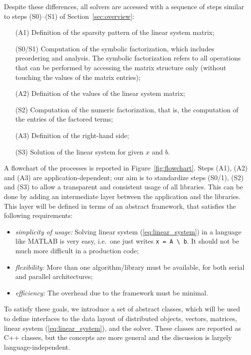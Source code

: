 \documentclass[acmtocl]{acmtrans2m}
\begin{document}
Despite these differences, all solvers are accessed with a sequence of
steps similar to steps (S0)--(S1) of Section~\ref{sec:overview}:
\begin{enumerate}
\item[(A1)] Definition of the sparsity pattern of the linear system matrix;
\item[(S0/S1)] Computation of the symbolic factorization, which includes
preordering and analysis. The
symbolic factorization refers to all operations that can be performed by
accessing the matrix structure only (without touching the values of the matrix entries);
\item[(A2)] Definition of the values of the linear system matrix;
\item[(S2)] Computation of the numeric factorization, that is, the computation
of the entries of the factored terms;
\item[(A3)] Definition of the right-hand side;
\item[(S3)] Solution of the linear system for given $x$ and $b$.
\end{enumerate}
A flowchart of the processes is reported in Figure~\ref{fig:flowchart}.
Steps (A1), (A2) and (A3) are application-dependent; 
our aim is to standardize steps (S0/1), (S2)
and (S3) to allow a transparent and consistent usage of all libraries. This
can be done by adding an intermediate layer between the application and the
libraries. This layer will be defined in terms of an abstract framework, that
satisfies the following requirements:
\begin{itemize}

\item {\sl simplicity of usage:} Solving linear system (\ref{eq:linear_system}) in a language
like MATLAB is very easy, i.e.~one just writes \verb!x = A \ b!. It should not be much
more difficult in a production code;

\item {\sl flexibility:} More than one algorithm/library must be available,
  for both serial and parallel architectures;

\item {\sl efficiency:} The overhead due to the framework must be minimal.
\end{itemize}

To satisfy these goals, we introduce a set of abstract classes, which will be
used to define interfaces to the data layout of distributed objects, 
vectors, matrices, linear system (\ref{eq:linear_system}), and the solver.
These classes are reported as C++ classes, but the concepts are more general
and the discussion is largely language-independent.
\end{document}
